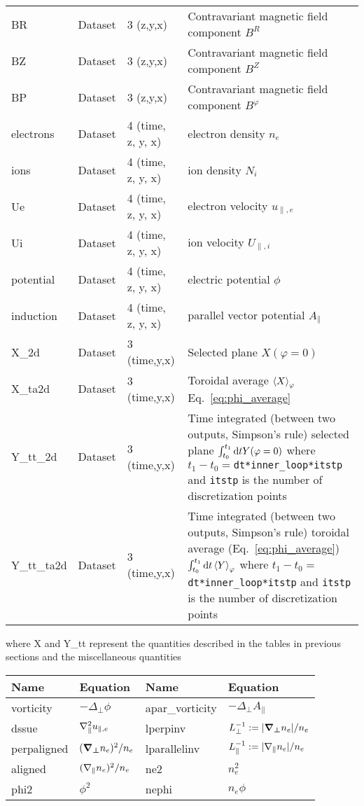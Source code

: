 \begin{longtable}{lll>{\RaggedRight}p{7cm}}
BR               & Dataset & 3 (z,y,x) & Contravariant magnetic field component $B^R$ \\
BZ               & Dataset & 3 (z,y,x) & Contravariant magnetic field component $B^Z$ \\
BP               & Dataset & 3 (z,y,x) & Contravariant magnetic field component $B^\varphi$ \\
electrons        & Dataset & 4 (time, z, y, x) & electron density $n_e$ \\
ions             & Dataset & 4 (time, z, y, x) & ion density $N_i$ \\
Ue               & Dataset & 4 (time, z, y, x) & electron velocity $u_{\parallel,e}$ \\
Ui               & Dataset & 4 (time, z, y, x) & ion velocity $U_{\parallel,i}$ \\
potential        & Dataset & 4 (time, z, y, x) & electric potential $\phi$ \\
induction        & Dataset & 4 (time, z, y, x) & parallel vector potential $A_\parallel$ \\
X\_2d            & Dataset & 3 (time,y,x) & Selected plane $X(\varphi=0)$ \\
X\_ta2d          & Dataset & 3 (time,y,x) & Toroidal average $\left \langle  X  \right\rangle_\varphi$
Eq.~\eqref{eq:phi_average} \\
Y\_tt\_2d        & Dataset & 3 (time,y,x) & Time integrated (between two outputs, Simpson's rule) selected plane
$\int_{t_0}^{t_1}\mathrm{d} t Y(\varphi=0) $
where $t_1 - t_0 = ${\tt dt*inner\_loop*itstp} and {\tt itstp} is the number of discretization points\\
Y\_tt\_ta2d      & Dataset & 3 (time,y,x) & Time integrated (between two outputs, Simpson's rule) toroidal average (Eq.~\eqref{eq:phi_average})
$\int_{t_0}^{t_1}\mathrm{d} t \left \langle  Y  \right\rangle_\varphi$
where $t_1 - t_0 = ${\tt dt*inner\_loop*itstp} and {\tt itstp} is the number of discretization points\\
\bottomrule
\end{longtable}
where
X and Y\_tt represent the quantities described in the tables in previous sections and the miscellaneous quantities
\begin{longtable}{llll}
\toprule
\rowcolor{gray!50}\textbf{Name} &  \textbf{Equation} & \textbf{Name} &  \textbf{Equation}\\
\midrule
    vorticity &$-\Delta_\perp\phi$ &
    apar\_vorticity &$-\Delta_\perp A_\parallel$ \\
    dssue & $\nabla_\parallel^2 u_{\parallel,e}$&
    lperpinv &$L_\perp^{-1} := |{\boldsymbol{{\boldsymbol{\nabla}}_{\perp}}} n_e|/n_e$ \\
    perpaligned &$({\boldsymbol{{\boldsymbol{\nabla}}_{\perp}}} n_e)^2/n_e$ &
    lparallelinv &$L_\parallel^{-1} := |\nabla_\parallel n_e|/n_e$ \\
    aligned &$ (\nabla_\parallel n_e)^2/n_e$ &
    ne2 & $n_e^2$ \\
    phi2 & $\phi^2$ &
    nephi & $n_e\phi$ \\
\bottomrule
\end{longtable}
